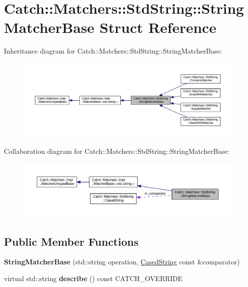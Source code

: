 \hypertarget{structCatch_1_1Matchers_1_1StdString_1_1StringMatcherBase}{}\section{Catch\+:\+:Matchers\+:\+:Std\+String\+:\+:String\+Matcher\+Base Struct Reference}
\label{structCatch_1_1Matchers_1_1StdString_1_1StringMatcherBase}


Inheritance diagram for Catch\+:\+:Matchers\+:\+:Std\+String\+:\+:String\+Matcher\+Base\+:\nopagebreak
\begin{figure}[H]
\begin{center}
\leavevmode
\includegraphics[width=350pt]{structCatch_1_1Matchers_1_1StdString_1_1StringMatcherBase__inherit__graph}
\end{center}
\end{figure}


Collaboration diagram for Catch\+:\+:Matchers\+:\+:Std\+String\+:\+:String\+Matcher\+Base\+:\nopagebreak
\begin{figure}[H]
\begin{center}
\leavevmode
\includegraphics[width=350pt]{structCatch_1_1Matchers_1_1StdString_1_1StringMatcherBase__coll__graph}
\end{center}
\end{figure}
\subsection*{Public Member Functions}
\begin{DoxyCompactItemize}
\item 
\mbox{\label{structCatch_1_1Matchers_1_1StdString_1_1StringMatcherBase_a133142ca9d70ff6e970126e4f612a99c}} 
{\bfseries String\+Matcher\+Base} (std\+::string operation, \hyperlink{structCatch_1_1Matchers_1_1StdString_1_1CasedString}{Cased\+String} const \&comparator)
\item 
\mbox{\label{structCatch_1_1Matchers_1_1StdString_1_1StringMatcherBase_a9d15cfb882efbea778b2ed29e7f48f37}} 
virtual std\+::string {\bfseries describe} () const C\+A\+T\+C\+H\+\_\+\+O\+V\+E\+R\+R\+I\+DE
\end{DoxyCompactItemize}
